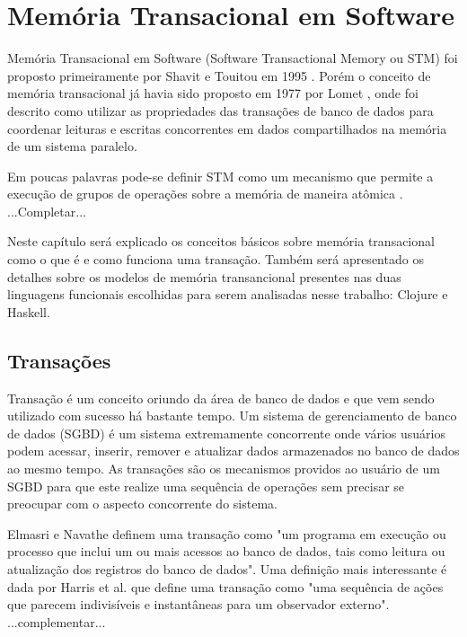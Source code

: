 \chapter{Memória Transacional em Software}

Memória Transacional em Software (Software Transactional Memory ou STM) foi proposto primeiramente por Shavit e Touitou em 1995 \cite{shavit1995software}. Porém o conceito de memória transacional já havia sido proposto em 1977 por Lomet \cite{lomet1977process}, onde foi descrito como utilizar as propriedades das transações de banco de dados para coordenar leituras e escritas concorrentes em dados compartilhados na memória de um sistema paralelo.

Em poucas palavras pode-se definir STM como um mecanismo que permite a execução de grupos de operações sobre a memória de maneira atômica \cite{shavit1995software}. ...Completar...

Neste capítulo será explicado os conceitos básicos sobre memória transacional como o que é e como funciona uma transação. Também será apresentado os detalhes sobre os modelos de memória transancional presentes nas duas linguagens funcionais escolhidas para serem analisadas nesse trabalho: Clojure e Haskell.

\section{Transações}

Transação é um conceito oriundo da área de banco de dados e que vem sendo utilizado com sucesso há bastante tempo. Um sistema de gerenciamento de banco de dados (SGBD) é um sistema extremamente concorrente onde vários usuários podem acessar, inserir, remover e atualizar dados armazenados no banco de dados ao mesmo tempo. As transações são os mecanismos providos ao usuário de um SGBD para que este realize uma sequência de operações sem precisar se preocupar com o aspecto concorrente do sistema. 

Elmasri e Navathe \cite{elmasri06db} definem uma transação como "um programa em execução ou processo que inclui um ou mais acessos ao banco de dados, tais como leitura ou atualização dos registros do banco de dados". Uma definição mais interessante é dada por Harris et al. \cite{harris2010transactional} que define uma transação como "uma sequência de ações que parecem indivisíveis e instantâneas para um observador externo". ...complementar...

